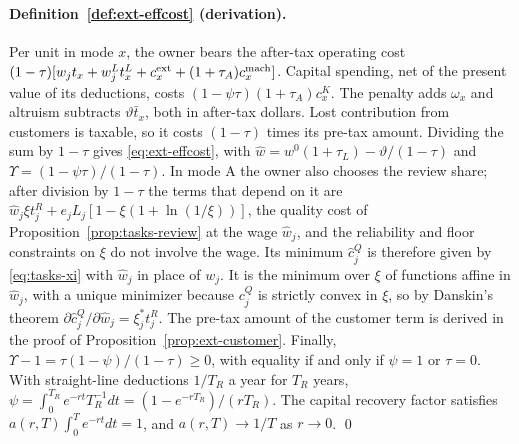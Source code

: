\paragraph{Definition~\ref{def:ext-effcost} (derivation).} Per unit in mode $x$, the owner bears the after-tax operating cost $(1-\tau)[w_jt_x+w^L_jt^L_x+c^{\rm ext}_x+(1+\tau_A)c^{\rm mach}_x]$. Capital spending, net of the present value of its deductions, costs $(1-\psi\tau)(1+\tau_A)c^K_x$. The penalty adds $\omega_x$ and altruism subtracts $\vartheta\bar t_x$, both in after-tax dollars. Lost contribution from customers is taxable, so it costs $(1-\tau)$ times its pre-tax amount. Dividing the sum by $1-\tau$ gives \eqref{eq:ext-effcost}, with $\hat w=w^0(1+\tau_L)-\vartheta/(1-\tau)$ and $\Upsilon=(1-\psi\tau)/(1-\tau)$. In mode A the owner also chooses the review share; after division by $1-\tau$ the terms that depend on it are $\hat w_j\xi t^R_j+e_jL_j[1-\xi(1+\ln(1/\xi))]$, the quality cost of Proposition~\ref{prop:tasks-review} at the wage $\hat w_j$, and the reliability and floor constraints on $\xi$ do not involve the wage. Its minimum $\hat c^Q_j$ is therefore given by \eqref{eq:tasks-xi} with $\hat w_j$ in place of $w_j$. It is the minimum over $\xi$ of functions affine in $\hat w_j$, with a unique minimizer because $c^Q_j$ is strictly convex in $\xi$, so by Danskin's theorem $\partial\hat c^Q_j/\partial\hat w_j=\xi^*_jt^R_j$. The pre-tax amount of the customer term is derived in the proof of Proposition~\ref{prop:ext-customer}. Finally, $\Upsilon-1=\tau(1-\psi)/(1-\tau)\ge0$, with equality if and only if $\psi=1$ or $\tau=0$. With straight-line deductions $1/T_R$ a year for $T_R$ years, $\psi=\int_0^{T_R}e^{-rt}T_R^{-1}dt=(1-e^{-rT_R})/(rT_R)$. The capital recovery factor satisfies $a(r,T)\int_0^Te^{-rt}dt=1$, and $a(r,T)\to1/T$ as $r\to0$. \qed

